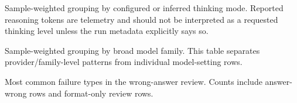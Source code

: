 \begin{table}[H]
  \centering
  \caption{Sample-weighted grouping by configured or inferred thinking mode.
  Reported reasoning tokens are telemetry and should not be interpreted as a
  requested thinking level unless the run metadata explicitly says so.}
  \label{tab:thinking-group-results}
  
\end{table}

\begin{table}[H]
  \centering
  \caption{Sample-weighted grouping by broad model family. This table separates
  provider/family-level patterns from individual model-setting rows.}
  \label{tab:model-family-results}
  
\end{table}

\begin{table}[H]
  \centering
  \caption{Most common failure types in the wrong-answer review. Counts include
  answer-wrong rows and format-only review rows.}
  \label{tab:failure-type-summary}
  
\end{table}
